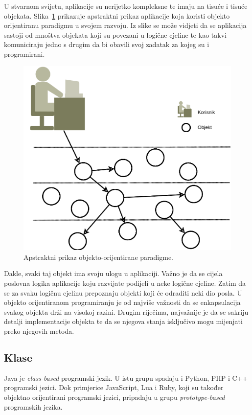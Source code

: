 U stvarnom svijetu, aplikacije su nerijetko kompleksne te imaju na tisuće i tisuće objekata. Slika~\ref{fig:oop_system_abstract_overview} prikazuje apstraktni prikaz aplikacije koja koristi objekto orijentiranu paradigmu u svojem razvoju. Iz slike se može vidjeti da se aplikacija sastoji od mnoštva objekata koji su povezani u logične cjeline te kao takvi komuniciraju jedno s drugim da bi obavili svoj zadatak za kojeg su i programirani.

\begin{figure}[!htbp]
    \caption{Apstraktni prikaz objekto-orijentirane paradigme.}
    \label{fig:oop_system_abstract_overview}
    \centering
    \includegraphics[scale=0.4]{images/oop_system_abstract_overview.png}
\end{figure}

Dakle, svaki taj objekt ima svoju ulogu u aplikaciji. Važno je da se cijela poslovna logika aplikacije koju razvijate podijeli u neke logične cjeline. Zatim da se za svaku logičnu cjelinu prepoznaju objekti koji će odraditi neki dio posla. U objekto orijentiranom programiranju je od najviše važnosti da se enkapsulacija svakog objekta drži na visokoj razini. Drugim riječima, najvažnije je da se sakriju detalji implementacije objekta te da se njegova stanja isključivo mogu mijenjati preko njegovih metoda.

\subsection{Klase}
Java je \emph{class-based} \cite{classbasedprogramming} programski jezik. U istu grupu spadaju i Python, PHP i C++ programski jezici. Dok primjerice JavaScript, Lua i Ruby, koji su također objektno orijentirani programski jezici, pripadaju u grupu \emph{prototype-based} \cite{prototypebasedprogramming} programskih jezika.

